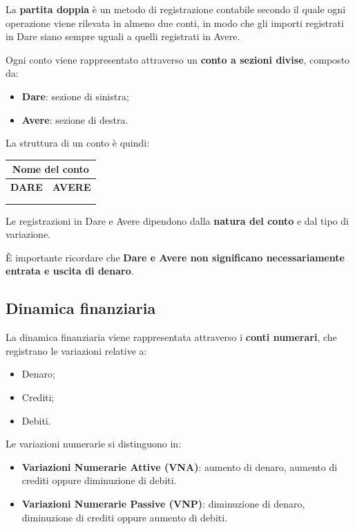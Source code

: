 \noindent La \textbf{partita doppia} è un metodo di registrazione
contabile secondo il quale ogni operazione viene rilevata
in almeno due conti, in modo che gli importi registrati
in Dare siano sempre uguali a quelli registrati in Avere.

\medskip

\noindent Ogni conto viene rappresentato attraverso
un \textbf{conto a sezioni divise}, composto da:

\begin{itemize}
    \item \textbf{Dare}: sezione di sinistra;
    \item \textbf{Avere}: sezione di destra.
\end{itemize}

\noindent La struttura di un conto è quindi:

\begin{center}
\begin{tabular}{c|c}
\multicolumn{2}{c}{\textbf{Nome del conto}} \\
\hline
\textbf{DARE} & \textbf{AVERE} \\
& \\
& \\
\end{tabular}
\end{center}

\noindent Le registrazioni in Dare e Avere dipendono
dalla \textbf{natura del conto} e dal tipo di variazione.

\medskip

\noindent È importante ricordare che
\textbf{Dare e Avere non significano necessariamente
entrata e uscita di denaro}.


\subsection{Dinamica finanziaria}

\noindent La dinamica finanziaria viene rappresentata
attraverso i \textbf{conti numerari}, che registrano
le variazioni relative a:

\begin{itemize}
    \item Denaro;
    \item Crediti;
    \item Debiti.
\end{itemize}

\noindent Le variazioni numerarie si distinguono in:

\begin{itemize}
    \item \textbf{Variazioni Numerarie Attive (VNA)}:
    aumento di denaro, aumento di crediti
    oppure diminuzione di debiti.

    \item \textbf{Variazioni Numerarie Passive (VNP)}:
    diminuzione di denaro, diminuzione di crediti
    oppure aumento di debiti.
\end{itemize}


